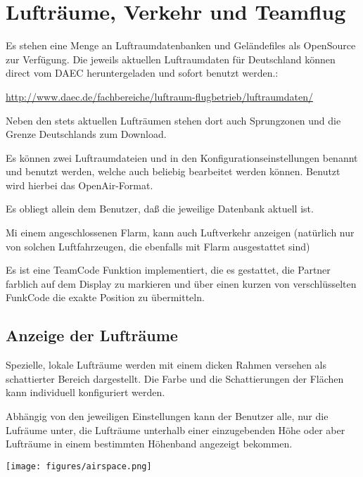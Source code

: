 \chapter{Lufträume, Verkehr und Teamflug}\label{cha:airspace}

Es stehen eine Menge an Luftraumdatenbanken und Geländefiles als   OpenSource zur Verfügung. Die
jeweils aktuellen Luftraumdaten für Deutschland können direct vom DAEC heruntergeladen und sofort
benutzt werden.: 
\begin{center}
  \url{http://www.daec.de/fachbereiche/luftraum-flugbetrieb/luftraumdaten/}
 \end{center}
 Neben den stets aktuellen Lufträumen stehen dort auch Sprungzonen und die Grenze Deutschlands zum Download. 
 
 Es können zwei Luftraumdateien  und in den Konfigurationseinstellungen benannt und benutzt werden, welche auch beliebig bearbeitet werden können. Benutzt wird hierbei das \textsf{OpenAir}-Format.



Es obliegt allein dem Benutzer, daß die jeweilige Datenbank aktuell ist.

Mi einem angeschlossenen Flarm, kann \xc  auch Luftverkehr anzeigen (natürlich nur von solchen
Luftfahrzeugen, die ebenfalls mit Flarm ausgestattet sind)

Es ist eine TeamCode Funktion implementiert, die es gestattet, die Partner farblich auf dem Display zu
markieren und über einen kurzen von \xc verschlüsselten FunkCode die exakte Position zu übermitteln.


\section{Anzeige der Lufträume}

Spezielle, lokale Lufträume werden mit einem dicken Rahmen versehen
als schattierter Bereich dargestellt. Die Farbe und die Schattierungen der
Flächen kann individuell konfiguriert werden.

Abhängig von den jeweiligen Einstellungen kann der Benutzer alle,
nur die Lufräume unter, die Lufträume unterhalb einer einzugebenden Höhe oder
aber Lufträume in einem bestimmten Höhenband angezeigt bekommen.


\begin{center}
\texttt{[image: figures/airspace.png]}
\end{center}

